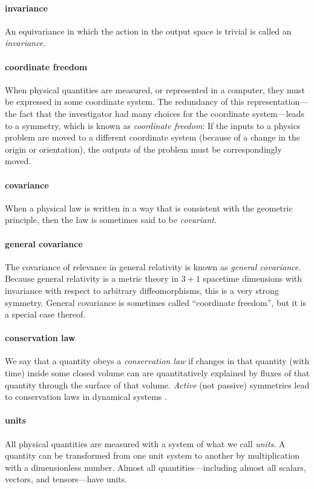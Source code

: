 \documentclass{article}
\theoremstyle{plain}
\theoremstyle{definition}
\theoremstyle{remark}
\begin{document}
\paragraph{invariance}
An equivariance in which the action in the output space is trivial is called an \emph{invariance}.

\paragraph{coordinate freedom}
When physical quantities are measured, or represented in a computer, they must be expressed in some coordinate system.
The redundancy of this representation---the fact that the investigator had many choices for the coordinate system---leads to a symmetry, which is known as \emph{coordinate freedom}:
If the inputs to a physics problem are moved to a different coordinate system (because of a change in the origin or orientation), the outputs of the problem must be correspondingly moved.

\paragraph{covariance}
When a physical law is written in a way that is consistent with the geometric principle, then the law is sometimes said to be \emph{covariant}.

\paragraph{general covariance}
The covariance of relevance in general relativity \cite{einstein} is known as \emph{general covariance}.
Because general relativity is a metric theory in $3+1$ spacetime dimensions with invariance with respect to arbitrary diffeomorphisms, this is a very strong symmetry.
General covariance is sometimes called ``coordinate freedom'', but it is a special case thereof.

\paragraph{conservation law}
We say that a quantity obeys a \emph{conservation law} if changes in that quantity (with time) inside some closed volume can are quantitatively explained by fluxes of that quantity through the surface of that volume.
\emph{Active} (not passive) symmetries lead to conservation laws in dynamical systems \cite{noether}.

\paragraph{units}
All physical quantities are measured with a system of what we call \emph{units}.
A quantity can be transformed from one unit system to another by multiplication with a dimensionless number.
Almost all quantities---including almost all scalars, vectors, and tensors---have units.
\end{document}
